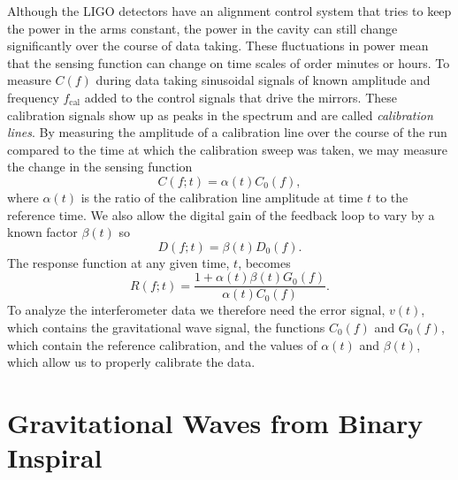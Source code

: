 Although the LIGO detectors have an alignment control system that tries to
keep the power in the arms constant, the power in the cavity can still change
significantly over the course of data taking. These fluctuations in power mean
that the sensing function can change on time scales of order minutes or hours.
To measure $C(f)$ during data taking sinusoidal signals of known amplitude and
frequency $f_\mathrm{cal}$ added to the control signals that drive the
mirrors. These calibration signals show up as peaks in the spectrum and are
called \emph{calibration lines}. By measuring the amplitude of a calibration
line  over the course of the run compared to the time at which the calibration
sweep was taken, we may measure the change in the sensing function
\begin{equation}
C(f;t) = \alpha(t) C_0(f),
\end{equation}
where $\alpha(t)$ is the ratio of the calibration line amplitude at time $t$
to the reference time. We also allow the digital gain of the feedback loop to
vary by a known factor $\beta(t)$ so 
\begin{equation}
D(f;t) = \beta(t) D_0(f).
\end{equation}
The response function at any given time, $t$, becomes
\begin{equation}
R(f;t) = \frac{1 + \alpha(t)\beta(t)G_0(f)}{\alpha(t)C_0(f)}.
\label{eq:calibration}
\end{equation}
To analyze the interferometer data we therefore need the error signal, $v(t)$,
which contains the gravitational wave signal, the functions $C_0(f)$ and
$G_0(f)$, which contain the reference calibration, and the values of
$\alpha(t)$ and $\beta(t)$, which allow us to properly calibrate the data.

\section{Gravitational Waves from Binary Inspiral}
\label{s:inspiralgw}

